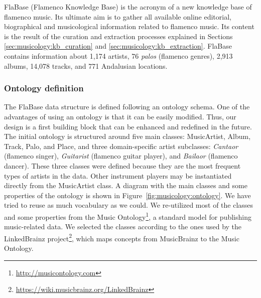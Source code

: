 FlaBase (Flamenco Knowledge Base) is the acronym of a new knowledge base of flamenco music. Its ultimate aim is to gather all available online editorial, biographical and musicological information related to flamenco music. Its content is the result of the curation and extraction processes explained in Sections \ref{sec:musicology:kb_curation} and \ref{sec:musicology:kb_extraction}. %
FlaBase contains information about 1,174 artists, 76 \textit{palos} (flamenco genres), 2,913 albums, 14,078 tracks, and 771 Andalusian locations.


\subsubsection{Ontology definition}
\label{sec:musicology:ontology}

The FlaBase data structure is defined following an ontology schema. One of the advantages of using an ontology is that it can be easily modified. Thus, our design is a first building block that can be enhanced and redefined in the future. The initial ontology is structured around five main classes: MusicArtist, Album, Track, Palo, and Place, and three domain-specific artist subclasses: \textit{Cantaor} (flamenco singer), \textit{Guitarist} (flamenco guitar player), and \textit{Bailaor} (flamenco dancer). These three classes were defined because they are the most frequent types of artists in the data. Other instrument players may be instantiated directly from the MusicArtist class. 
A diagram with the main classes and some properties of the ontology is shown in Figure~\ref{fig:musicology:ontology}.
We have tried to reuse as much vocabulary as we could. We re-utilized most of the classes and some properties from the Music Ontology\footnote{\url{http://musicontology.com}}, a standard model for publishing music-related data. We selected the classes according to the ones used by the LinkedBrainz project\footnote{\url{https://wiki.musicbrainz.org/LinkedBrainz}}, which maps concepts from MusicBrainz to the Music Ontology.

